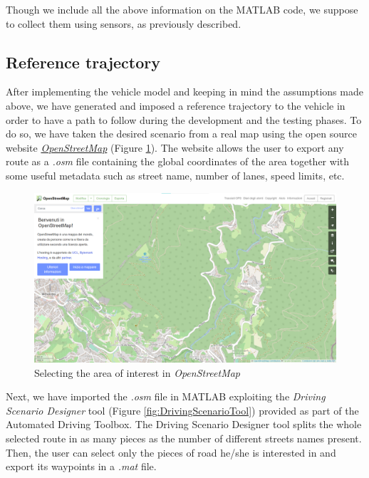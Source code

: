 Though we include all the above information on the MATLAB code, we suppose to collect them using sensors, as previously described.








\subsection{Reference trajectory}
After implementing the vehicle model and keeping in mind the assumptions made above, we have generated and imposed a reference trajectory to the vehicle in order to have a path to follow during the development and the testing phases.
To do so, we have taken the desired scenario from a real map using the open source website \href{https://www.openstreetmap.org}{\textit{OpenStreetMap}}\cite{OpenStreetMap} (Figure \ref{fig:OpenStreetMap}).
The website allows the user to export any route as a \textit{.osm} file containing the global coordinates of the area together with some useful metadata such as street name, number of lanes, speed limits, etc.

\begin{figure}[H]
    \centering
    \includegraphics[width=1\textwidth]{Figures/OpenStreetMap.png}
    \caption{Selecting the area of interest in \textit{OpenStreetMap}}
      \label{fig:OpenStreetMap}
\end{figure}

Next, we have imported the \textit{.osm} file in MATLAB exploiting the \textit{Driving Scenario Designer} tool (Figure \ref{fig:DrivingScenarioTool}) provided as part of the Automated Driving Toolbox. The Driving Scenario Designer tool splits the whole selected route in as many pieces as the number of different streets names present. Then, the user can select only the pieces of road he/she is interested in and export its waypoints in a \textit{.mat} file.

